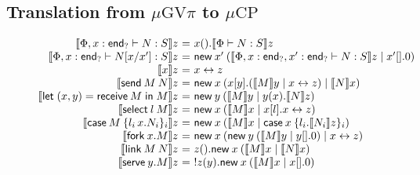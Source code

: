 \documentclass[orivec,envcountsame]{llncs}
\makeatletter
\newcommand{\cpdual}[1]{#1^\perp}
\newcommand{\interm}{\mkwd{end}_?}
\newcommand{\cptyp}[2]{#1 \vdash #2}
\newcommand{\gvtyp}[3]{#1 \vdash #2 : #3}
\newcommand{\mkwd}[1]{\mathsf{#1}}
\newcommand{\link}[2]{#1 \leftrightarrow #2}
\newcommand{\cut}[4]{\mkwd{new}\:#1 \: (#3 \mid #4)}
\newcommand{\replicate}[2]{{!#1(#2)}}
\renewcommand{\case}[2]{\mkwd{case}\:#1\:\{#2\}}
\newcommand{\gvsend}[2]{\mkwd{send}\:#1\:#2}
\newcommand{\gvreceive}[1]{\mkwd{receive}\:#1}
\newcommand{\gvlet}[3]{\mkwd{let}\;#1 = #2\;\mkwd{in}\;#3}
\newcommand{\gvselect}[2]{\mkwd{select}\:#1\:#2}
\newcommand{\gvcase}[2]{\mkwd{case}\:#1\:\{#2\}}
\newcommand{\gvlink}[2]{\mkwd{link}\:#1\:#2}
\newcommand{\gvfork}[2]{\mkwd{fork}\:#1.#2}
\newcommand{\gvserve}[2]{\mkwd{serve}\:#1.#2}
\newcommand{\tocp}[1]{\llbracket #1 \rrbracket}
\newcommand{\mucp}{$\mu\mathrm{CP}$\xspace}
\newcommand{\gvpi}{$\mu\mathrm{GV}\pi$\xspace}
\newcommand{\ba}{\begin{array}}
\newcommand{\ea}{\end{array}}
\newenvironment{equations}{\[\ba{@{}r@{~}c@{~}l@{}}}{\ea\]}
\makeatother
\begin{document}
\subsection{Translation from \gvpi to \mucp}\label{sec:gvpitocp}

\begin{figure}[float]
\vspace{-2ex}
\small
\begin{equations}
\tocp{\gvtyp{\Phi,x:\interm}{N}{S}}z &=& x().\tocp{\gvtyp{\Phi}{N}{S}}z \\
\tocp{\gvtyp{\Phi,x:\interm}{N[x/x']}{S}}z &=& 
  \cut{x'}{}{\tocp{\gvtyp{\Phi,x:\interm,x':\interm}{N}{S}}z}{x'[].0} \\
\tocp{x}z &=& \link{x}{z} \\
\tocp{\gvsend{M}{N}}z &=& \cut{x}{}{x[y].(\tocp{M}y \mid \link{x}{z})}{\tocp{N}x} \\
\tocp{\gvlet{(x,y)}{\gvreceive{M}}{M}}z &=& \cut{y}{}{\tocp{M}y}{y(x).\tocp{N}z} \\
\tocp{\gvselect{l}{M}}z &=& \cut{x}{}{\tocp{M}x}{x[l].\link{x}{z}} \\
\tocp{\gvcase{M}{l_i\,x.N_i}_i}z &=&  \cut{x}{}{\tocp{M}x}{\case{x}{l_i.\tocp{N_i}z}_i} \\
\tocp{\gvfork{x}{M}}z &=& \cut{x}{}{\cut{y}{}{\tocp{M}y}{y[].0}}{\link{x}{z}} \\
\tocp{\gvlink{M}{N}}z &=& z().\cut{x}{}{\tocp{M}x}{\tocp{N}x} \\
\tocp{\gvserve{y}{M}}z &=& \replicate{z}{y}.\cut{x}{}{\tocp{M}x}{x[].0} \\

\end{equations}
\end{figure}
\end{document}
